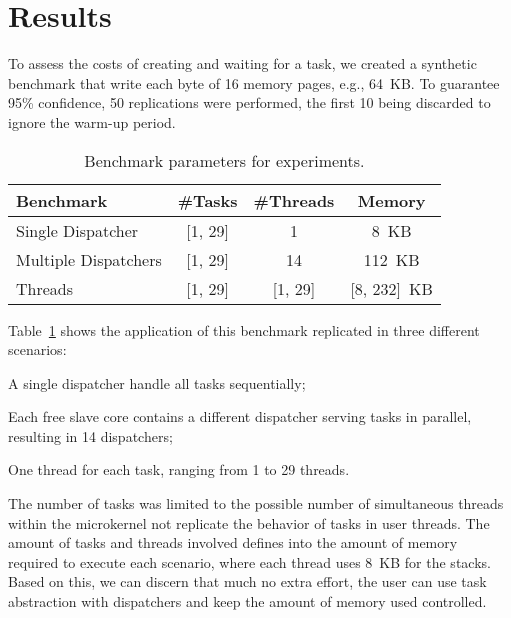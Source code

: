 \section{Results}
\label{sec:results}

	To assess the costs of creating and waiting for a task, we created
	a synthetic benchmark that write each byte of 16 memory pages, e.g., 64~KB.
	To guarantee 95\% confidence, 50 replications were performed, the first 10
	being discarded to ignore the warm-up period.

	\begin{table}[t]
	\centering
	\caption{Benchmark parameters for experiments.}
	\label{tab:parameters}
	\begin{tabular}{lccc}
	\toprule
			\textbf{Benchmark}   & \textbf{\#Tasks} & \textbf{\#Threads} & \textbf{Memory} \\
			\midrule
			Single Dispatcher    & [1, 29]          & 1                  & 8~KB            \\
			Multiple Dispatchers & [1, 29]          & 14                 & 112~KB          \\
			Threads              & [1, 29]          & [1, 29]            & [8, 232]~KB     \\
			\bottomrule
	\end{tabular}
	\end{table}

	Table~\ref{tab:parameters} shows the application of this benchmark replicated in three
	different scenarios:
	\begin{enumerate*}[label=(\roman*)]
		\item A single dispatcher handle all tasks sequentially;
		\item Each free slave core contains a different dispatcher serving
			tasks in parallel, resulting in 14 dispatchers;
		\item One thread for each task, ranging from 1 to 29 threads.
	\end{enumerate*}
	The number of tasks was limited to the possible number of simultaneous
	threads within the microkernel not replicate the behavior of tasks in user
	threads. The amount of tasks and threads involved defines into the amount
	of memory required to execute each scenario, where each thread uses 8~KB
	for the stacks. Based on this, we can discern that much no extra effort,
	the user can use task abstraction with dispatchers and keep the amount of
	memory used controlled.

